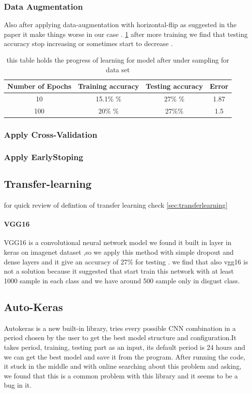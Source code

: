 \subsubsection{Data Augmentation}
Also after applying data-augmentation with horizontal-flip as suggested in the paper\cite{state_of_art}
it make things worse in our case .
\ref{tab:table12} after more training we find that testing accuracy stop increasing or sometimes start to decrease .
\begin{table}[h!]
	\centering
	\caption{this table holds the progress of learning for model after under sampling for data set}
	\label{tab:table12}
	\begin{tabular}{c | c | c | c}
		\textbf{Number of Epochs} & \textbf{Training accuracy} & \textbf{Testing accuracy} & \textbf{Error}\\ \hline 
		10 & 15.1\% \% & 27\% \% & 1.87 \\
		100 & 20\% \% &  27\%\% & 1.5 \\
	\end{tabular}
\end{table}
\subsubsection{Apply Cross-Validation}
\subsubsection{Apply EarlyStoping}
\subsection{Transfer-learning}
\paragraph{}
for quick review of defintion of transfer learning check \ref{sec:transferlearning} 
\paragraph{VGG16}
VGG16 is a convolutional neural network model we found it built in layer in keras on imagenet dataset ,so we apply this method with simple dropout and dense layers and it give an accuracy of 27\% for testing .
we find that also vgg16 is not a solution because it suggested that start train this network with at least 1000 sample in each class and we have around 500 sample only in disgust class.
\subsection{Auto-Keras}
\paragraph{}
Autokeras is a new built-in library, tries every possible CNN combination in a period chosen by the user to get the best model structure and configuration.It takes period, training, testing part as an input, its default period is 24 hours and we can get the best model and save it from the program.
After running the code, it stuck in the middle and with online searching about this problem and asking, we found that this is a common problem with this library and it seems to be a bug in it.
